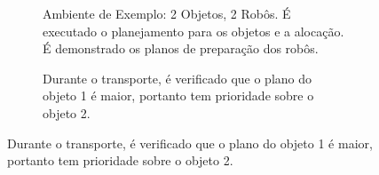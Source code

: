 \begin{figure}[htpb]
  \centering
  \setlength{\fboxsep}{0pt}
  \begin{subfigure}[t]{0.45\textwidth}
    \centering
    \caption{Ambiente de Exemplo: 2 Objetos, 2 Robôs. É executado o planejamento para os objetos e a alocação. É demonstrado os planos de preparação dos robôs.}
  \end{subfigure}
  \hspace{0.2cm}
  \begin{subfigure}[t]{0.45\textwidth}
    \centering
    \caption{Durante o transporte, é verificado que o plano do objeto 1 é maior, portanto tem prioridade sobre o objeto 2.}
  \end{subfigure}


\end{figure}
